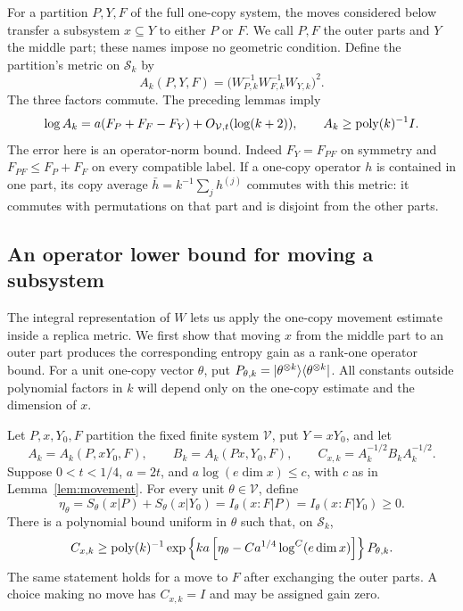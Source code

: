 For a partition $P,Y,F$ of the full one-copy system, the moves considered
below transfer a subsystem $x\subseteq Y$ to either $P$ or $F$.
We call $P,F$ the outer parts and $Y$ the middle part; these names
impose no geometric condition. Define the partition's metric on
$\mathcal S_k$ by
\begin{equation}\label{replicas:leaf-metric}
 A_k(P,Y,F)=\bigl(W_{P,k}^{-1}W_{F,k}^{-1}W_{Y,k}\bigr)^2.
\end{equation}
The three factors commute.  The preceding lemmas imply
\begin{equation}\label{replicas:leaf-floor}
 \log A_k=a(F_P+F_F-F_Y)+O_{\mathcal V,t}(\log(k+2)),
 \qquad A_k\ge\operatorname{poly}(k)^{-1}I.
\end{equation}
The error here is an operator-norm bound.  Indeed $F_Y=F_{PF}$ on
symmetry and $F_{PF}\le F_P+F_F$ on every compatible label.
If a one-copy operator $h$ is contained in one part, its copy average
$\bar h=k^{-1}\sum_jh^{(j)}$ commutes with this metric: it commutes
with permutations on that part and is disjoint from the other parts.

\subsection{An operator lower bound for moving a subsystem}

The integral representation of $W$ lets us apply the one-copy movement
estimate inside a replica metric.  We first show that moving $x$ from
the middle part to an outer part produces the corresponding entropy gain
as a rank-one operator bound.  For a unit one-copy vector $\theta$, put
$P_{\theta,k}=\lvert \theta^{\otimes k}\rangle\langle \theta^{\otimes k}\rvert$.
All constants outside polynomial factors in $k$ will depend only on
the one-copy estimate and the dimension of $x$.

\begin{lemma}\label{lem:relative-pin}
Let $P,x,Y_0,F$ partition the fixed finite system $\mathcal V$, put
$Y=xY_0$, and let
\[
 A_k=A_k(P,xY_0,F),\qquad B_k=A_k(Px,Y_0,F),\qquad
 C_{x,k}=A_k^{-1/2}B_kA_k^{-1/2}.
\]
Suppose $0<t<1/4$, $a=2t$, and
$a\log(e\dim x)\le c$, with $c$ as in Lemma~\ref{lem:movement}.
For every unit $\theta\in\mathcal V$, define
\[
 \eta_\theta=S_\theta(x|P)+S_\theta(x|Y_0)
             =I_\theta(x:F|P)=I_\theta(x:F|Y_0)\ge0.
\]
There is a polynomial bound uniform in $\theta$ such that, on
$\mathcal S_k$,
\begin{equation}\label{replicas:relative-pin}
 C_{x,k}\ge\operatorname{poly}(k)^{-1}
   \exp\left\{ka\left[\eta_\theta
          -C a^{1/4}\log^C(e\dim x)\right]\right\}
             P_{\theta,k}.
\end{equation}
The same statement holds for a move to $F$ after exchanging the outer
parts.  A choice making no move has $C_{x,k}=I$ and may be assigned
gain zero.
\end{lemma}

